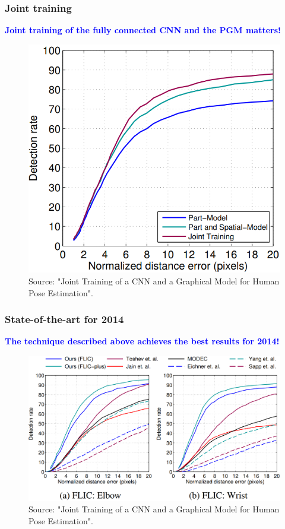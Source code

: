 \documentclass{beamer}
\newcommand\blue[1]{\textcolor{blue}{\textbf{#1}}}
\begin{document}
	\begin{frame}[t]
		\frametitle{Joint training}
		\begin{center}
			\blue{Joint training of the fully connected CNN and the PGM matters!}
			\begin{figure}
				\includegraphics[scale=0.31]{joint_training_matters.png} \\
				\scriptsize Source: "Joint Training of a CNN and a Graphical Model for Human Pose Estimation".
			\end{figure}
		\end{center}
	\end{frame}
	
	
	\begin{frame}[t]
		\frametitle{State-of-the-art for 2014}
		\begin{center}
			\blue{The technique described above achieves the best results for 2014!}
			\begin{figure}
				\includegraphics[scale=0.24]{sota.png} \\
				\scriptsize Source: "Joint Training of a CNN and a Graphical Model for Human Pose Estimation".
			\end{figure}
		\end{center}
	\end{frame}
\end{document}
